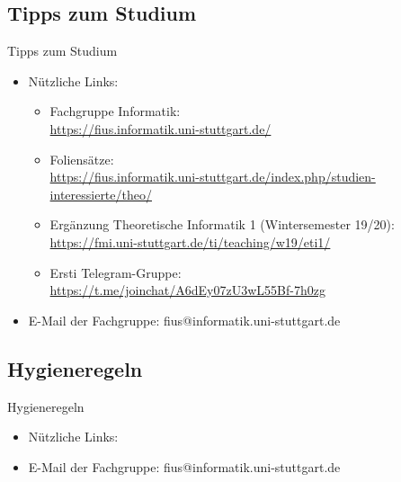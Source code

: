 \subsection{Tipps zum Studium}
\begin{frame}[fragile]{Tipps zum Studium}
    \begin{itemize}
        \item Nützliche Links:\\
            \begin{itemize}
                \item Fachgruppe Informatik:\\
                \url{https://fius.informatik.uni-stuttgart.de/}
                \item Foliensätze:\\ \url{https://fius.informatik.uni-stuttgart.de/index.php/studien-interessierte/theo/}
                \item Ergänzung Theoretische Informatik 1 (Wintersemester 19/20): \\
                \url{https://fmi.uni-stuttgart.de/ti/teaching/w19/eti1/}
                \item Ersti Telegram-Gruppe:\\
                \url{https://t.me/joinchat/A6dEy07zU3wL55Bf-7h0zg}
        	\end{itemize}
        \item E-Mail der Fachgruppe: fius@informatik.uni-stuttgart.de

    \end{itemize}
\end{frame}


\subsection{Hygieneregeln}
\begin{frame}[fragile]{Hygieneregeln}
	\begin{itemize}
		\item Nützliche Links:\\
		\item E-Mail der Fachgruppe: fius@informatik.uni-stuttgart.de
		
	\end{itemize}
\end{frame}


